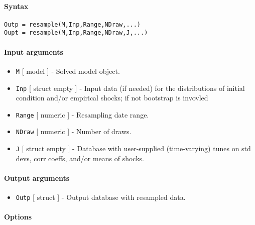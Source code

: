 


	\paragraph{Syntax}\label{syntax}

\begin{verbatim}
Outp = resample(M,Inp,Range,NDraw,...)
Oupt = resample(M,Inp,Range,NDraw,J,...)
\end{verbatim}

\paragraph{Input arguments}\label{input-arguments}

\begin{itemize}
\item
  \texttt{M} {[} model {]} - Solved model object.
\item
  \texttt{Inp} {[} struct \textbar{} empty {]} - Input data (if needed)
  for the distributions of initial condition and/or empirical shocks; if
  not bootstrap is invovled
\item
  \texttt{Range} {[} numeric {]} - Resampling date range.
\item
  \texttt{NDraw} {[} numeric {]} - Number of draws.
\item
  \texttt{J} {[} struct \textbar{} empty {]} - Database with
  user-supplied (time-varying) tunes on std devs, corr coeffs, and/or
  means of shocks.
\end{itemize}

\paragraph{Output arguments}\label{output-arguments}

\begin{itemize}
\itemsep1pt\parskip0pt
\item
  \texttt{Outp} {[} struct {]} - Output database with resampled data.
\end{itemize}

\paragraph{Options}\label{options}

